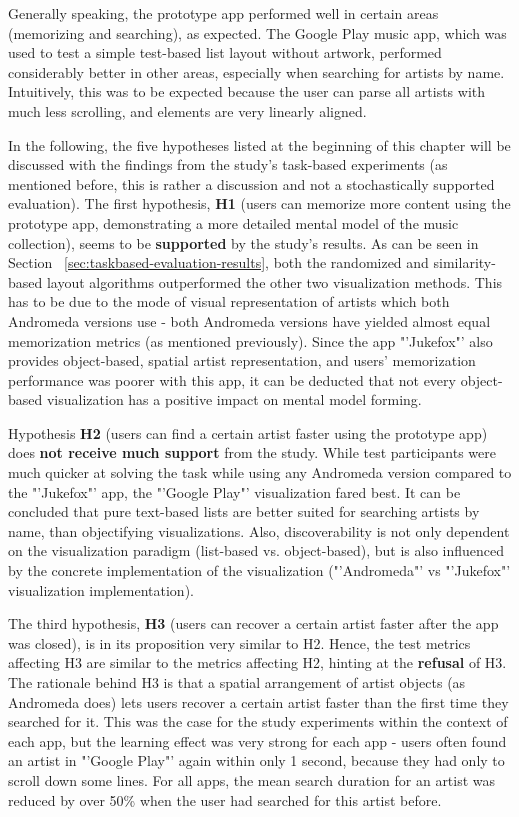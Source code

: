 Generally speaking, the prototype app performed well in certain areas (memorizing and searching), as expected. The Google Play music app, which was used to test a simple test-based list layout without artwork, performed considerably better in other areas, especially when searching for artists by name. Intuitively, this was to be expected because the user can parse all artists with much less scrolling, and elements are very linearly aligned.

In the following, the five hypotheses listed at the beginning of this chapter will be discussed with the findings from the study's task-based experiments (as mentioned before, this is rather a discussion and not a stochastically supported evaluation).
The first hypothesis, \textbf{H1} (users can memorize more content using the prototype app, demonstrating a more detailed mental model of the music collection), seems to be \textbf{supported} by the study's results. As can be seen in Section ~\ref{sec:taskbased-evaluation-results}, both the randomized and similarity-based layout algorithms outperformed the other two visualization methods. This has to be due to the mode of visual representation of artists which both Andromeda versions use - both Andromeda versions have yielded almost equal memorization metrics (as mentioned previously). Since the app "'Jukefox"' also provides object-based, spatial artist representation, and users' memorization performance was poorer with this app, it can be deducted that not every object-based visualization has a positive impact on mental model forming.

Hypothesis \textbf{H2} (users can find a certain artist faster using the prototype app) does \textbf{not receive much support} from the study. While test participants were much quicker at solving the task while using any Andromeda version compared to the "'Jukefox"' app, the "'Google Play"' visualization fared best. It can be concluded that pure text-based lists are better suited for searching artists by name, than objectifying visualizations. Also, discoverability is not only dependent on the visualization paradigm (list-based vs. object-based), but is also influenced by the concrete implementation of the visualization ("'Andromeda"' vs "'Jukefox"' visualization implementation).
 
The third hypothesis, \textbf{H3} (users can recover a certain artist faster after the app was closed), is in its proposition very similar to H2. Hence, the test metrics affecting H3 are similar to the metrics affecting H2, hinting at the \textbf{refusal} of H3. The rationale behind H3 is that a spatial arrangement of artist objects (as Andromeda does) lets users recover a certain artist faster than the first time they searched for it. This was the case for the study experiments within the context of each app, but the learning effect was very strong for each app - users often found an artist in "'Google Play"' again within only 1 second, because they had only to scroll down some lines. For all apps, the mean search duration for an artist was reduced by over 50\% when the user had searched for this artist before.

